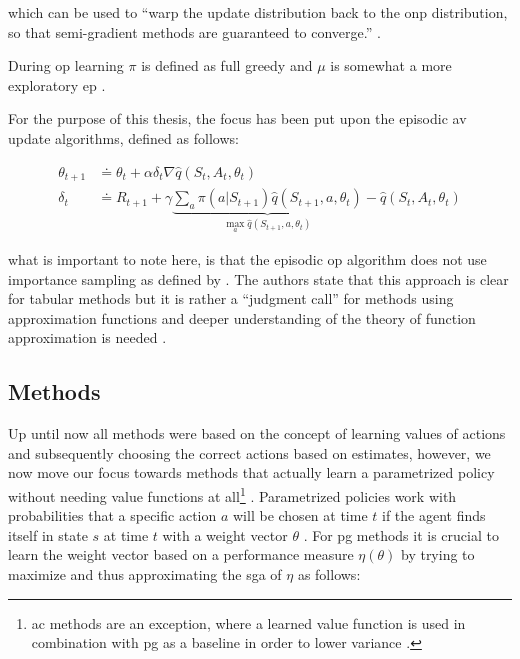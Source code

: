\documentclass[draft=false]{seal_thesis}
\begin{document}
which can be used to ``warp the update distribution back to the \gls{onp} distribution, so that semi-gradient methods are guaranteed to converge.'' \citep[p. 243]{Sutton2017}.

During \gls{op} learning $\pi$ is defined as full greedy and $\mu$ is somewhat a more exploratory \gls{ep} \citep[p. 243]{Sutton2017}.

For the purpose of this thesis, the focus has been put upon the episodic \gls{av} update algorithms, defined as follows:

\begin{align}
	\theta_{t+1} &\doteq \theta_t + \alpha \delta_t \nabla \hat{q} (S_t,A_t,\theta_t)\\
	\delta_t &\doteq R_{t+1} + \gamma \underbrace{\sum_a \pi (a|S_{t+1}) \hat{q} (S_{t+1},a,\theta_t)}_{\max_a \hat{q} (S_{t+1},a,\theta_t)} - \hat{q} (S_t,A_t,\theta_t)
\end{align}

what is important to note here, is that the episodic \gls{op} algorithm does not use importance sampling as defined by  \citep[p. 244]{Sutton2017}. The authors state that this approach is clear for tabular methods but it is rather a ``judgment call'' for methods using approximation functions and deeper understanding of the theory of function approximation is needed \citep[p. 244]{Sutton2017}.

\subsection{ Methods}
\label{subsec:polgrad_methods}

Up until now all methods were based on the concept of learning values of actions and subsequently choosing the correct actions based on estimates, however, we now move our focus towards methods that actually learn a parametrized policy without needing value functions at all\footnote{\gls{ac} methods are an exception, where a learned value function is used in combination with \gls{pg} as a baseline in order to lower variance \citep{Sutton2017}.}  \citep[p. 265]{Sutton2017}. Parametrized policies work with probabilities that a specific action $a$ will be chosen at time $t$ if the agent finds itself in state $s$ at time $t$ with a weight vector $\theta$ \citep[p. 265]{Sutton2017}. For \gls{pg} methods it is crucial to learn the weight vector based on a performance measure $\eta(\theta)$ by trying to maximize and thus approximating the \gls{sga} of $\eta$ as follows:
\end{document}
